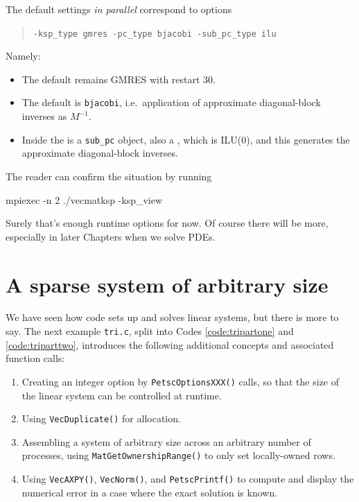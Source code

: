 The default \PETSc \pKSP settings \emph{in parallel} correspond to options
\begin{quote}
\texttt{-ksp\_type gmres -pc\_type bjacobi -sub\_pc\_type ilu}
\end{quote}
Namely:
\begin{itemize}
\item The default \pKSP remains GMRES with restart 30.
\item The default \pPC is \texttt{bjacobi}, i.e.~application of approximate diagonal-block inverses as $M^{-1}$.
\item Inside the \pPC is a \texttt{sub\_pc} object, also a \pPC, which is ILU($0$), and this generates the approximate diagonal-block inverses.
\end{itemize}
The reader can confirm the situation by running
\begin{cline}
mpiexec -n 2 ./vecmatksp -ksp_view
\end{cline}

Surely that's enough runtime options for now.  Of course there will be more, especially in later Chapters when we solve PDEs.


\section{A sparse system of arbitrary size}

We have seen how \PETSc code sets up and solves linear systems, but there is more to say.  The next example \texttt{tri.c}, split into Codes \ref{code:tripartone} and \ref{code:triparttwo}, introduces the following additional concepts and associated function calls:
\begin{enumerate}
\item Creating an integer option by \texttt{PetscOptionsXXX()} calls, so that the size of the linear system can be controlled at runtime.
\item Using \texttt{VecDuplicate()} for allocation.
\item Assembling a system of arbitrary size across an arbitrary number of processes, using \texttt{MatGetOwnershipRange()} to only set locally-owned rows.
\item Using \texttt{VecAXPY()}, \texttt{VecNorm()}, and \texttt{PetscPrintf()} to compute and display the numerical error in a case where the exact solution is known.
\end{enumerate}

